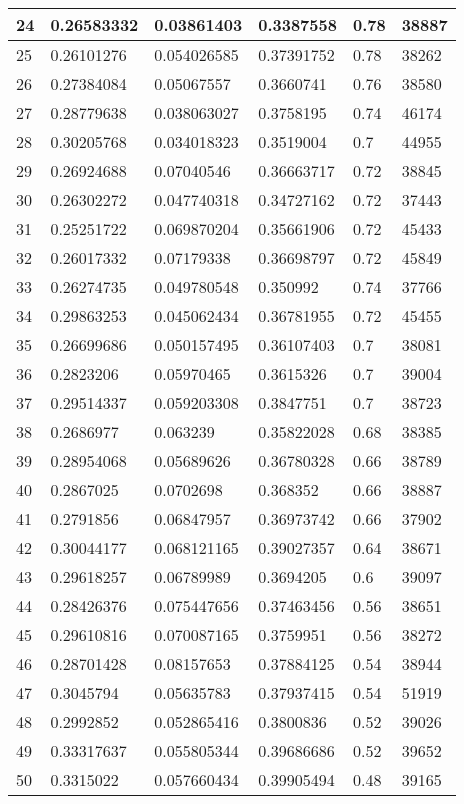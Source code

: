 \begin{longtable}{|l|l|l|l|l|l|}
24 & 0.26583332 & 0.03861403 & 0.3387558 & 0.78 & 38887 \\ \hline 
25 & 0.26101276 & 0.054026585 & 0.37391752 & 0.78 & 38262 \\ \hline 
26 & 0.27384084 & 0.05067557 & 0.3660741 & 0.76 & 38580 \\ \hline 
27 & 0.28779638 & 0.038063027 & 0.3758195 & 0.74 & 46174 \\ \hline 
28 & 0.30205768 & 0.034018323 & 0.3519004 & 0.7 & 44955 \\ \hline 
29 & 0.26924688 & 0.07040546 & 0.36663717 & 0.72 & 38845 \\ \hline 
30 & 0.26302272 & 0.047740318 & 0.34727162 & 0.72 & 37443 \\ \hline 
31 & 0.25251722 & 0.069870204 & 0.35661906 & 0.72 & 45433 \\ \hline 
32 & 0.26017332 & 0.07179338 & 0.36698797 & 0.72 & 45849 \\ \hline 
33 & 0.26274735 & 0.049780548 & 0.350992 & 0.74 & 37766 \\ \hline 
34 & 0.29863253 & 0.045062434 & 0.36781955 & 0.72 & 45455 \\ \hline 
35 & 0.26699686 & 0.050157495 & 0.36107403 & 0.7 & 38081 \\ \hline 
36 & 0.2823206 & 0.05970465 & 0.3615326 & 0.7 & 39004 \\ \hline 
37 & 0.29514337 & 0.059203308 & 0.3847751 & 0.7 & 38723 \\ \hline 
38 & 0.2686977 & 0.063239 & 0.35822028 & 0.68 & 38385 \\ \hline 
39 & 0.28954068 & 0.05689626 & 0.36780328 & 0.66 & 38789 \\ \hline 
40 & 0.2867025 & 0.0702698 & 0.368352 & 0.66 & 38887 \\ \hline 
41 & 0.2791856 & 0.06847957 & 0.36973742 & 0.66 & 37902 \\ \hline 
42 & 0.30044177 & 0.068121165 & 0.39027357 & 0.64 & 38671 \\ \hline 
43 & 0.29618257 & 0.06789989 & 0.3694205 & 0.6 & 39097 \\ \hline 
44 & 0.28426376 & 0.075447656 & 0.37463456 & 0.56 & 38651 \\ \hline 
45 & 0.29610816 & 0.070087165 & 0.3759951 & 0.56 & 38272 \\ \hline 
46 & 0.28701428 & 0.08157653 & 0.37884125 & 0.54 & 38944 \\ \hline 
47 & 0.3045794 & 0.05635783 & 0.37937415 & 0.54 & 51919 \\ \hline 
48 & 0.2992852 & 0.052865416 & 0.3800836 & 0.52 & 39026 \\ \hline 
49 & 0.33317637 & 0.055805344 & 0.39686686 & 0.52 & 39652 \\ \hline 
50 & 0.3315022 & 0.057660434 & 0.39905494 & 0.48 & 39165 \\ \hline 
\end{longtable}